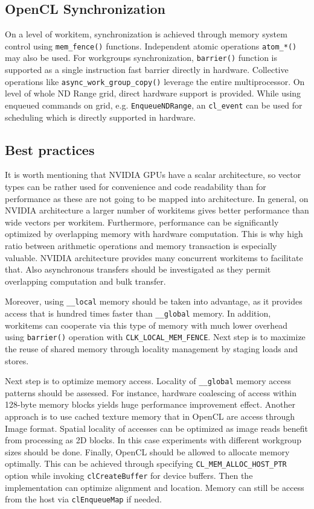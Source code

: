 \subsection{OpenCL Synchronization}
On a level of workitem, synchronization is achieved through memory system control using \texttt{mem\_fence()} functions. Independent atomic operations \texttt{atom\_*()} may also be used. For workgroups synchronization, \texttt{barrier()} function is supported as a single instruction fast barrier directly in hardware. Collective operations like \texttt{async\_work\_group\_copy()} leverage the entire multiprocessor. On level of whole ND Range grid, direct hardware support is provided. While using enqueued commands on grid, e.g. \texttt{EnqueueNDRange}, an \texttt{cl\_event} can be used for scheduling which is directly supported in hardware.

\subsection{Best practices}
It is worth mentioning that NVIDIA GPUs have a scalar architecture, so vector types can be rather used for convenience and code readability than for performance as these are not going to be mapped into architecture. In general, on NVIDIA architecture a larger number of workitems gives better performance than wide vectors per workitem. Furthermore, performance can be significantly optimized by overlapping memory with hardware computation. This is why high ratio between arithmetic operations and memory transaction is especially valuable. NVIDIA architecture provides many concurrent workitems to facilitate that. Also asynchronous transfers should be investigated as they permit overlapping computation and bulk transfer.

Moreover, using \texttt{\_\_local} memory should be taken into advantage, as it provides access that is hundred times faster than \texttt{\_\_global} memory. In addition, workitems can cooperate via this type of memory with much lower overhead using \texttt{barrier()} operation with \texttt{CLK\_LOCAL\_MEM\_FENCE}. Next step is to maximize the reuse of shared memory through locality management by staging loads and stores.

Next step is to optimize memory access. Locality of \texttt{\_\_global} memory access patterns should be assessed. For instance, hardware coalescing of access within 128-byte memory blocks yields huge performance improvement effect. Another approach is to use cached texture memory that in OpenCL are access through Image format. Spatial locality of accesses can be optimized as image reads benefit from processing as 2D blocks. In this case experiments with different workgroup sizes should be done. Finally, OpenCL should be allowed to allocate memory optimally. This can be achieved through specifying \texttt{CL\_MEM\_ALLOC\_HOST\_PTR} option while invoking \texttt{clCreateBuffer} for device buffers. Then the implementation can optimize alignment and location. Memory can still be access from the host via \texttt{clEnqueueMap} if needed.

